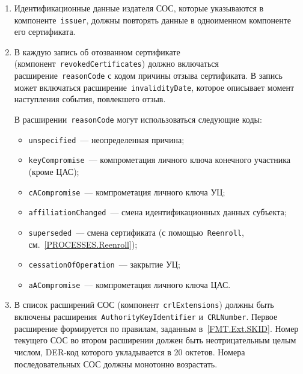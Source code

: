 \begin{enumerate}
\item
Идентификационные данные издателя СОС, которые указываются в 
компоненте~\texttt{issuer}, должны повторять данные в одноименном 
компоненте его сертификата. 

\item
В каждую запись об отозванном сертификате 
(компонент~\texttt{revokedCertificates}) должно включаться 
расширение~\texttt{reasonCode} с кодом причины отзыва сертификата. 
%
В запись может включаться расширение~\texttt{invalidityDate}, которое 
описывает момент наступления события, повлекшего отзыв.

В расширении~\texttt{reasonCode} могут использоваться следующие коды:
\begin{itemize}
\item
\texttt{unspecified}~--- неопределенная причина;
\item
\texttt{keyCompromise}~--- компрометация личного ключа конечного участника 
(кроме ЦАС); 
\item
\texttt{cACompromise}~--- компрометация личного ключа УЦ;
\item
\texttt{affiliationChanged}~--- смена идентификационных данных субъекта;
\item
\texttt{superseded}~--- смена сертификата (с помощью~\texttt{Reenroll}, 
см.~\ref{PROCESSES.Reenroll}); 
\item
\texttt{cessationOfOperation}~--- закрытие УЦ;
\item
\texttt{aACompromise}~--- компрометация личного ключа ЦАС.
\end{itemize}

\item
В список расширений СОС (компонент~\texttt{crlExtensions})
должны быть включены расширения~\texttt{AuthorityKeyIdentifier} 
и~\texttt{CRLNumber}. Первое расширение формируется по правилам,
заданным в~\ref{FMT.Ext.SKID}. Номер текущего СОС во втором расширении
должен быть неотрицательным целым числом, DER-код которого укладывается в 
20 октетов. Номера последовательных СОС должны монотонно возрастать.
\end{enumerate}
